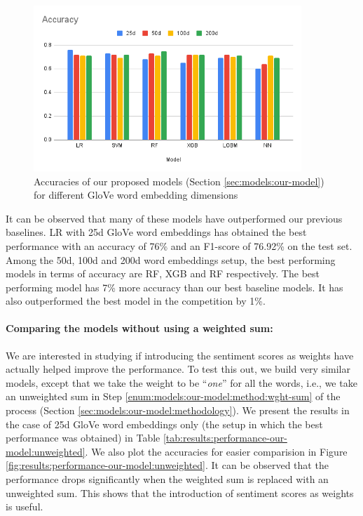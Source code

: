 \begin{figure}[htbp]
    \centering
    \includegraphics[width=0.9\textwidth]{assets/img/our-model_all.png}
    \caption[Accuracies of our proposed models (Section \ref{sec:models:our-model}) for different \texorpdfstring{GloVe}{GloVe} word embedding dimensions]{Accuracies of our proposed models (Section \ref{sec:models:our-model}) for different \ac{GloVe} word embedding dimensions}
    \label{fig:results:performance-our-model}
\end{figure}

It can be observed that many of these models have outperformed our previous baselines. \ac{LR} with 25d \ac{GloVe} word embeddings has obtained the best performance with an accuracy of 76\% and an F1-score of 76.92\% on the test set. Among the 50d, 100d and 200d word embeddings setup, the best performing models in terms of accuracy are \ac{RF}, \ac{XGB} and \ac{RF} respectively. The best performing model has 7\% more accuracy than our best baseline models. It has also outperformed the best model in the competition by 1\%.

\paragraph{Comparing the models without using a weighted sum:} 
We are interested in studying if introducing the sentiment scores as weights have actually helped improve the performance. To test this out, we build very similar models, except that we take the weight to be ``\textit{one}'' for all the words, i.e., we take an unweighted sum in Step \ref{enum:models:our-model:method:wght-sum} of the process (Section \ref{sec:models:our-model:methodology}). We present the results in the case of 25d \ac{GloVe} word embeddings only (the setup in which the best performance was obtained) in Table \ref{tab:results:performance-our-model:unweighted}. We also plot the accuracies for easier comparision in Figure \ref{fig:results:performance-our-model:unweighted}. It can be observed that the performance drops significantly when the weighted sum is replaced with an unweighted sum. This shows that the introduction of sentiment scores as weights is useful. 

